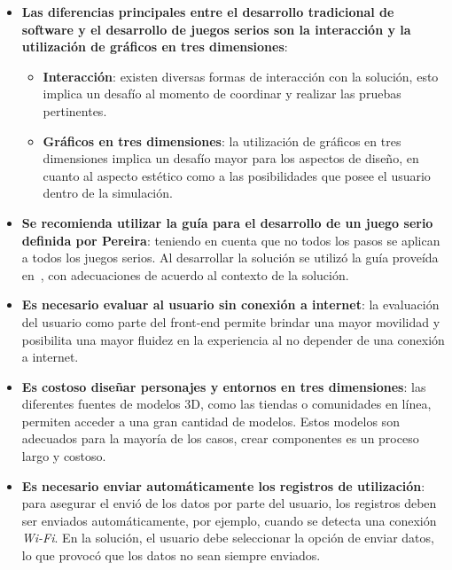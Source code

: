 \begin{itemize}

\item \textbf{Las diferencias principales entre el desarrollo tradicional de software  y el desarrollo de juegos serios son la interacción y la utilización de gráficos en tres dimensiones}: 

    \begin{itemize}

    \item \textbf{Interacción}: existen diversas formas de interacción con la solución, esto implica un desafío al momento de coordinar y realizar las pruebas pertinentes.

    \item \textbf{Gráficos en tres dimensiones}: la utilización de gráficos en tres dimensiones implica un desafío mayor para los aspectos de diseño, en cuanto al aspecto estético como a las posibilidades que posee el usuario dentro de la simulación.

    \end{itemize}


\item \textbf{Se recomienda utilizar la guía para el desarrollo de un juego serio definida por Pereira\cite{pereira2009design}}: teniendo en cuenta que no todos los pasos se aplican a todos los juegos serios. Al desarrollar la solución se utilizó la guía proveída en~\cite{pereira2009design}, con adecuaciones de acuerdo al contexto de la solución.


\item \textbf{Es necesario evaluar al usuario sin conexión a internet}: la evaluación del usuario como parte del front-end permite brindar una mayor movilidad y posibilita una mayor fluidez en la experiencia al no depender de una conexión a internet. 

\item \textbf{Es costoso diseñar personajes y entornos en tres dimensiones}: las diferentes fuentes de modelos 3D, como las tiendas o comunidades en línea, permiten acceder a una gran cantidad de modelos. Estos modelos son adecuados para la mayoría de los casos, crear componentes es un proceso largo y costoso. 

\item \textbf{Es necesario enviar automáticamente los registros de utilización}: para asegurar el envió de los datos por parte del usuario, los registros deben ser enviados automáticamente, por ejemplo, cuando se detecta una conexión \textit{Wi-Fi}. En la solución, el usuario debe seleccionar la opción de enviar datos, lo que provocó que los datos no sean siempre enviados.

\end{itemize}

